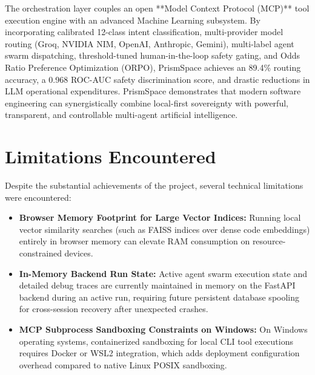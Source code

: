\documentclass[12pt,a4paper]{report}
\begin{document}
The orchestration layer couples an open **Model Context Protocol (MCP)** tool execution engine with an advanced Machine Learning subsystem. By incorporating calibrated 12-class intent classification, multi-provider model routing (Groq, NVIDIA NIM, OpenAI, Anthropic, Gemini), multi-label agent swarm dispatching, threshold-tuned human-in-the-loop safety gating, and Odds Ratio Preference Optimization (ORPO), PrismSpace achieves an 89.4\% routing accuracy, a 0.968 ROC-AUC safety discrimination score, and drastic reductions in LLM operational expenditures. PrismSpace demonstrates that modern software engineering can synergistically combine local-first sovereignty with powerful, transparent, and controllable multi-agent artificial intelligence.

\section{Limitations Encountered}
Despite the substantial achievements of the project, several technical limitations were encountered:
\begin{itemize}\setlength{\itemsep}{2pt}\setlength{\parskip}{0pt}\setlength{\parsep}{0pt}
    \item \textbf{Browser Memory Footprint for Large Vector Indices:} Running local vector similarity searches (such as FAISS indices over dense code embeddings) entirely in browser memory can elevate RAM consumption on resource-constrained devices.
    \item \textbf{In-Memory Backend Run State:} Active agent swarm execution state and detailed debug traces are currently maintained in memory on the FastAPI backend during an active run, requiring future persistent database spooling for cross-session recovery after unexpected crashes.
    \item \textbf{MCP Subprocess Sandboxing Constraints on Windows:} On Windows operating systems, containerized sandboxing for local CLI tool executions requires Docker or WSL2 integration, which adds deployment configuration overhead compared to native Linux POSIX sandboxing.
\end{itemize}
\end{document}
